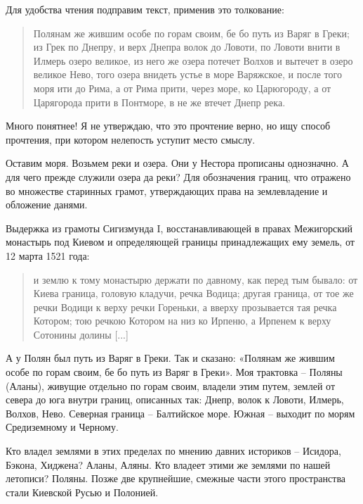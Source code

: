 Для удобства чтения подправим текст, применив это толкование:

\begin{quotation}
Полянам же жившим особе по горам своим, бе бо путь из Варяг в Греки; из Грек по Днепру, и верх Днепра волок до Ловоти, по Ловоти внити в Илмерь озеро великое, из него же озера потечет Волхов и вытечет в озеро великое Нево, того озера внидеть устье в море Варяжское, и после того моря ити до Рима, а от Рима прити, через море, ко Царюгороду, а от Царягорода прити в Понтморе, в не же втечет Днепр река.
\end{quotation}

Много понятнее! Я не утверждаю, что это прочтение верно, но ищу способ прочтения, при котором нелепость уступит место смыслу.


Оставим моря. Возьмем реки и озера. Они у Нестора прописаны однозначно. А для чего прежде служили озера да реки? Для обозначения границ, что отражено во множестве старинных грамот, утверждающих права на землевладение и обложение данями.

Выдержка из грамоты Сигизмунда I, восстанавливающей в правах Межигорский монастырь под Киевом и определяющей границы принадлежащих ему земель, от 12 марта 1521 года:

\begin{quotation}
и землю к тому монастырю держати по давному, как перед тым бывало: от Киева граница, головую кладучи, речка Водица; другая граница, от тое же речки Водици к верху речки Гореньки, а вверху прозывается тая речка Котором; тою речкою  Котором на низ ко Ирпеню, а Ирпенем к верху Сотонины долины [...]
\end{quotation}


А у Полян был путь из Варяг в Греки. Так и сказано: «Полянам же жившим особе по горам своим, бе бо путь из Варяг в Греки». Моя трактовка – Поляны (Аланы), живущие отдельно по горам своим, владели этим путем, землей от севера до юга внутри границ, описанных так: Днепр, волок к Ловоти, Илмерь, Волхов, Нево. Северная граница – Балтийское море. Южная – выходит по морям Средиземному и Черному. 

Кто владел землями в этих пределах по мнению давних историков – Исидора, Бэкона, Хиджена? Аланы, Аляны. Кто владеет этими же землями по нашей летописи? Поляны. Позже две крупнейшие, смежные части этого пространства стали Киевской Русью и Полонией.


